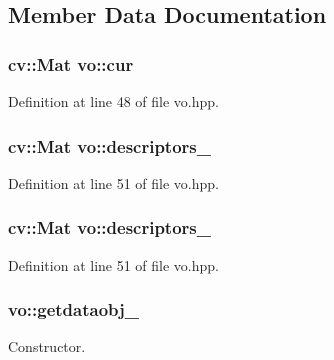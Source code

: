 \subsection{Member Data Documentation}
\subsubsection[{\texorpdfstring{cur}{cur}}]{\setlength{\rightskip}{0pt plus 5cm}cv\+::\+Mat vo\+::cur}\hypertarget{classvo_aac8fbbf6490232cb02775fad298674cd}{}\label{classvo_aac8fbbf6490232cb02775fad298674cd}


Definition at line 48 of file vo.\+hpp.

\subsubsection[{\texorpdfstring{descriptors\+\_\+1}{descriptors_1}}]{\setlength{\rightskip}{0pt plus 5cm}cv\+::\+Mat vo\+::descriptors\+\_}\hypertarget{classvo_a927e2c8dd06a377ee2a129b560b2304a}{}\label{classvo_a927e2c8dd06a377ee2a129b560b2304a}


Definition at line 51 of file vo.\+hpp.

\subsubsection[{\texorpdfstring{descriptors\+\_\+2}{descriptors_2}}]{\setlength{\rightskip}{0pt plus 5cm}cv\+::\+Mat vo\+::descriptors\+\_}\hypertarget{classvo_ac5f6dcad86a52c20957698e3fd8d43c1}{}\label{classvo_ac5f6dcad86a52c20957698e3fd8d43c1}


Definition at line 51 of file vo.\+hpp.

\subsubsection[{\texorpdfstring{getdataobj\+\_\+}{getdataobj_}}]{ vo\+::getdataobj\+\_\+}\hypertarget{classvo_ac42f9a37e2a255371ae0641561b80de5}{}\label{classvo_ac42f9a37e2a255371ae0641561b80de5}


Constructor. 



